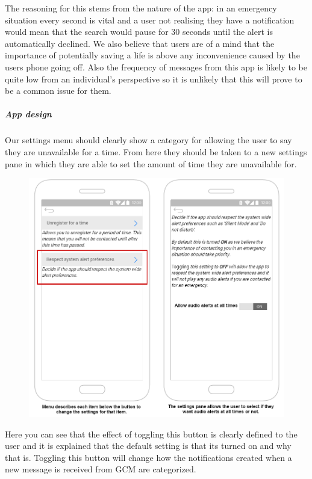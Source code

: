 \documentclass{article}
\begin{document}
The reasoning for this stems from the nature of the app: in an emergency situation every second is vital and a user not realising they have a notification would mean that the search would pause for 30 seconds until the alert is automatically declined. We also believe that users are of a mind that the importance of potentially saving a life is above any inconvenience caused by the users phone going off. Also the frequency of messages from this app is likely to be quite low from an individual's perspective so it is unlikely that this will prove to be a common issue for them.

\subparagraph{App design}
Our settings menu should clearly show a category for allowing the user to say they are unavailable for a time. From here they should be taken to a new settings pane in which they are able to set the amount of time they are unavailable for.\\

	\begin{figure}[H]
		\centering
		\vspace{-20pt}
		\includegraphics[width=1\textwidth]{"Iteration5/Storyboard - Iteration 6 - 2"}
	\end{figure}

Here you can see that the effect of toggling this button is clearly defined to the user and it is explained that the default setting is that its turned on and why that is. Toggling this button will change how the notifications created when a new message is received from GCM are categorized.\\
\end{document}
